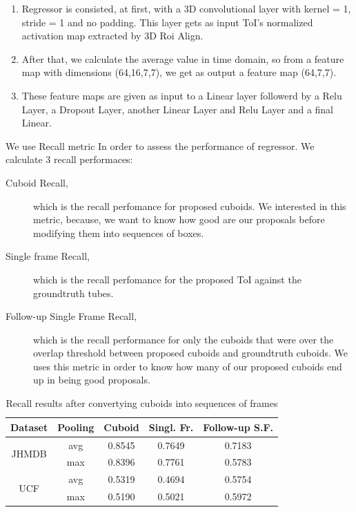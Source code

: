 \documentclass{report}
\begin{document}
\begin{enumerate}
\item Regressor is consisted, at first, with a 3D convolutional layer with kernel = 1, stride = 1 and no padding. This layer gets as input ToI's normalized activation map extracted by 3D Roi Align.
\item After that, we calculate the average value in time domain, so from a feature map with dimensions (64,16,7,7), we get as output a feature map (64,7,7).
\item These feature maps are given as input to a Linear layer followerd by a Relu Layer, a Dropout Layer, another Linear Layer and Relu Layer and a final Linear.
\end{enumerate}

We use Recall metric In order to assess the performance of regressor. We calculate 3 recall performaces:
\begin{description}
\item [Cuboid Recall,] which is the recall perfomance for proposed cuboids. We interested in this metric, because, we
  want to know how good are our proposals before modifying them into sequences of boxes.

\item [Single frame Recall,] which is the recall perfomance for the proposed ToI against the groundtruth tubes.
\item[Follow-up Single Frame Recall,] which is the recall performance for only the cuboids that were over the overlap threshold between
  proposed cuboids and groundtruth cuboids. We uses this metric in order to know how many of our proposed cuboids end up in being good proposals.
\end{description}

\begin{table}[h]
  \centering
  \begin{tabular} {||c | c || c | c | c ||}
    \hline
    \textbf{Dataset} & \textbf{Pooling} & \textbf{Cuboid} & \textbf{Singl. Fr. } &  \textbf{Follow-up S.F.}\\
    \hline                
    \multirow{2}{*}{JHMDB} & avg & 0.8545 & 0.7649 & 0.7183 \\
    \cline{2-5}
    {} & max & 0.8396 & 0.7761 & 0.5783 \\
    \cline{1-5}
    \multirow{2}{*}{UCF} & avg & 0.5319 & 0.4694 & 0.5754 \\
    \cline{2-5}
    {} & max & 0.5190 & 0.5021 & 0.5972 \\
    \cline{1-5}
                                   
  \end{tabular}
  \caption{Recall results after convertying cuboids into sequences of frames}
  \label{table:reg_1_1}
\end{table}
\end{document}
